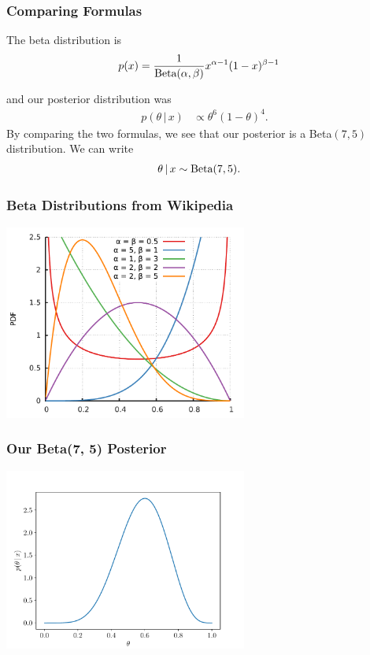 \documentclass{beamer}
\newcommand{\given}{\,|\,}
\begin{document}
\begin{frame}
\frametitle{Comparing Formulas}

The beta distribution is
\begin{align}
p(x) &= \frac{1}{\textnormal{Beta}(\alpha, \beta)}
            x^{\alpha - 1}(1-x)^{\beta - 1}
\end{align}

and our posterior distribution was
\begin{align}
p(\theta \given x) &\propto \theta^6(1-\theta)^4.
\end{align}\pause
By comparing the two formulas, we see that our posterior is
a Beta$(7, 5)$ distribution. We can write
\begin{align}
\theta \given x &\sim \textnormal{Beta}(7, 5).
\end{align}

\end{frame}

\begin{frame}
\frametitle{Beta Distributions from Wikipedia}

\begin{center}
\includegraphics[width=0.6\textwidth]{images/betas.pdf}
\end{center}

\end{frame}

\begin{frame}
\frametitle{Our Beta(7, 5) Posterior}

\begin{center}
\includegraphics[width=0.6\textwidth]{images/beta_posterior.pdf}
\end{center}

\end{frame}
\end{document}
